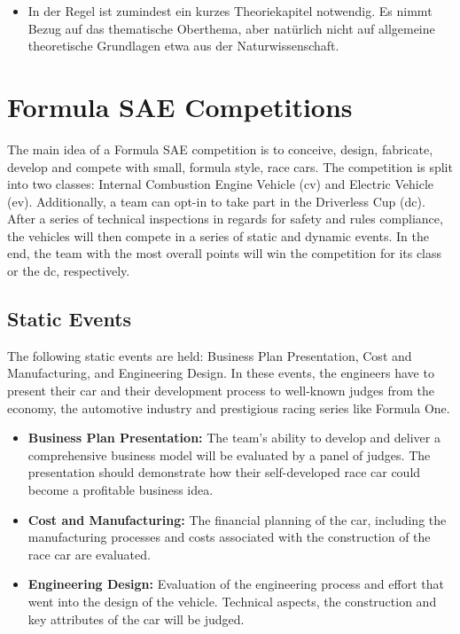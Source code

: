 \begin{itemize}
    \item In der Regel ist zumindest ein kurzes Theoriekapitel notwendig. Es nimmt Bezug auf das thematische Oberthema, aber natürlich nicht auf allgemeine theoretische Grundlagen etwa aus der Naturwissenschaft.
\end{itemize}

\section{Formula SAE Competitions}
The main idea of a Formula SAE competition is to conceive, design, fabricate, develop and compete with small, formula style, race cars.
The competition is split into two classes: Internal Combustion Engine Vehicle (\acrshort{cv}) and Electric Vehicle (\acrshort{ev}).
Additionally, a team can opt-in to take part in the Driverless Cup (\acrshort{dc}).
After a series of technical inspections in regards for safety and rules compliance, the vehicles will then compete in a series of static and dynamic events. In the end, the team with the most overall points will win the competition for its class or the \acrlong{dc}, respectively.

\subsection{Static Events}
The following static events are held: Business Plan Presentation, Cost and Manufacturing, and Engineering Design. In these events, the engineers have to present their car and their development process to well-known judges from the economy, the automotive industry and prestigious racing series like Formula One.

\begin{itemize}
    \item \textbf{Business Plan Presentation:} The team's ability to develop and deliver a comprehensive business model will be evaluated by a panel of judges. The presentation should demonstrate how their self-developed race car could become a profitable business idea.
    \item \textbf{Cost and Manufacturing:} The financial planning of the car, including the manufacturing processes and costs associated with the construction of the race car are evaluated.
    \item \textbf{Engineering Design:} Evaluation of the engineering process and effort that went into the design of the vehicle. Technical aspects, the construction and key attributes of the car will be judged.
\end{itemize}

